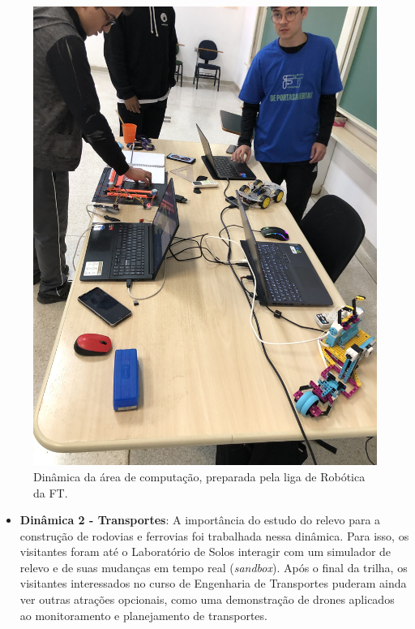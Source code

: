 \documentclass[
  letterpaper,
  DIV=11,
  numbers=noendperiod]{scrreprt}
\providecommand{\tightlist}{%
  \setlength{\itemsep}{0pt}\setlength{\parskip}{0pt}}\usepackage{longtable,booktabs,array}
\begin{document}
\begin{figure}[H]

{\centering \includegraphics[width=0.6\linewidth,height=\textheight,keepaspectratio]{planejamento/dinamica-computacao.jpg}

}

\caption{Dinâmica da área de computação, preparada pela liga de Robótica
da FT.}

\end{figure}%

\begin{itemize}
\tightlist
\item
  \textbf{Dinâmica 2 - Transportes}: A importância do estudo do relevo
  para a construção de rodovias e ferrovias foi trabalhada nessa
  dinâmica. Para isso, os visitantes foram até o Laboratório de Solos
  interagir com um simulador de relevo e de suas mudanças em tempo real
  (\emph{sandbox}). Após o final da trilha, os visitantes interessados
  no curso de Engenharia de Transportes puderam ainda ver outras
  atrações opcionais, como uma demonstração de drones aplicados ao
  monitoramento e planejamento de transportes.
\end{itemize}
\end{document}
